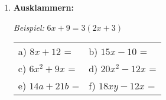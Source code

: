 \begin{enumerate}[label=\arabic*.]
    \vspace{1cm}

    \item \textbf{Ausklammern:}

    \textit{Beispiel:} $6x + 9 = 3(2x + 3)$

    \vspace{0.5cm}
    \begin{tabular}{ll}
        a) $8x + 12$ = \underline{\hspace{4cm}} & b) $15x - 10$ = \underline{\hspace{4cm}} \\[2ex]
        c) $6x^2 + 9x$ = \underline{\hspace{4cm}} & d) $20x^2 - 12x$ = \underline{\hspace{4cm}} \\[2ex]
        e) $14a + 21b$ = \underline{\hspace{4cm}} & f) $18xy - 12x$ = \underline{\hspace{4cm}}
    \end{tabular}

\end{enumerate}